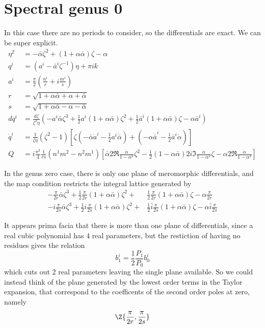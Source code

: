 \documentclass{article}
\begin{document}
\section{Spectral genus 0} %
\label{sec:spectral_genus_0}
In this case there are no periods to consider, so the differentials are exact. We can be super explicit.
\begin{align*}
\eta^2 &= -\bar\alpha \zeta^2 + (1+\alpha\bar\alpha)\zeta - \alpha \\
q^i &= (a^i - \bar a^i \zeta^{-1})\eta + \pi i k \\
a^i &= \frac{\pi}{2}\left( \frac{n^i}{r} + i \frac{m^i}{s} \right) \\
r &= \sqrt{1 + \alpha\bar\alpha + \alpha + \bar\alpha} \\
s &= \sqrt{1 + \alpha\bar\alpha - \alpha - \bar\alpha} \\
dq^i &= \frac{d\zeta}{\zeta^2\eta} \left( -a^i\bar\alpha\zeta^3 + \frac{1}{2}a^i(1+\alpha\bar\alpha)\zeta^2 + \frac{1}{2}\bar a^i(1+\alpha\bar\alpha)\zeta  - \alpha\bar a^i\right) \\
\dot q^i &= \frac{1}{\zeta\eta}(\zeta^2-1)\left[ \zeta(-\bar\alpha\dot a^i - \frac{1}{2} a^i \dot{\bar\alpha}) + (-\alpha\dot {\bar a}^i - \frac{1}{2} \bar a^i \dot\alpha) \right]\\
Q &= i \frac{\pi^2}{4}\frac{1}{rs}(n^1m^2-n^2m^1) \left[ \bar\alpha 2\Re \frac{\dot\alpha}{1-\alpha^2}\zeta^2 - \frac{1}{2}(1-\alpha\bar\alpha)2i\Im \frac{\dot\alpha}{1-\alpha^2} \zeta - \alpha 2\Re \frac{\dot\alpha}{1-\alpha^2}\right]
\end{align*}

In the genus zero case, there is only one plane of meromorphic differentials, and the map condition restricts the integral lattice generated by
\begin{align*}
-\frac{\pi}{2r}\bar\alpha\zeta^3 + \frac{1}{2}\frac{\pi}{2r}(1+\alpha\bar\alpha)\zeta^2 +& \frac{1}{2}\frac{\pi}{2r}(1+\alpha\bar\alpha)\zeta  - \alpha\frac{\pi}{2r} \\
-i\frac{\pi}{2s}\bar\alpha\zeta^3 + \frac{1}{2}i\frac{\pi}{2s}(1+\alpha\bar\alpha)\zeta^2 +& \frac{1}{2}\bar i\frac{\pi}{2s}(1+\alpha\bar\alpha)\zeta  - \alpha\bar i\frac{\pi}{2s}
\end{align*}

It appears prima facia that there is more than one plane of differentials, since a real cubic polynomial has 4 real parameters, but the restiction of having no residues gives the relation
\[
b^i_1 = \frac{1}{2}\frac{P_1}{P_0}b^i_0
\]
which cuts out 2 real parameters leaving the single plane available. So we could instead think of the plane generated by the lowest order terms in the Taylor expansion, that correspond to the coefficents of the second order poles at zero, namely
\[
\Z\{\frac{\pi}{2r}, \frac{\pi}{2s}\}
\]
\end{document}
